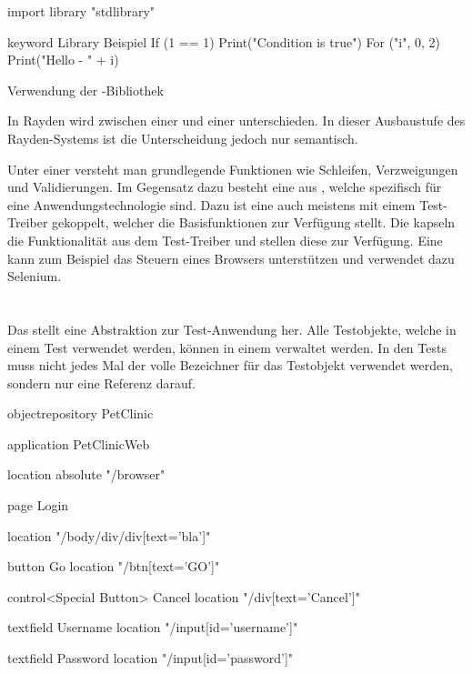 \begin{program}
\begin{JavaCode}
import library "stdlibrary"

keyword Library Beispiel {
	If (1 == 1){
		Print("Condition is true")
	}
	For ("i", 0, 2){
		Print("Hello - " + i)
	}
}
\end{JavaCode}
\caption{Verwendung der -Bibliothek}
\label{prog:libraryUsage}
\end{program}

\SuperPar
In Rayden wird zwischen einer  und einer  unterschieden. In dieser Ausbaustufe des Rayden-Systems ist die Unterscheidung jedoch nur semantisch. 

\SuperPar
Unter einer  versteht man grundlegende Funktionen wie Schleifen, Verzweigungen und Validierungen. Im Gegensatz dazu besteht eine  aus , welche spezifisch für eine Anwendungstechnologie sind. Dazu ist eine  auch meistens mit einem Test-Treiber gekoppelt, welcher die Basisfunktionen zur Verfügung stellt. Die  kapseln die Funktionalität aus dem Test-Treiber und stellen diese zur Verfügung. Eine  kann zum Beispiel das Steuern eines Browsers unterstützen und verwendet dazu Selenium. 


\section{}

Das  stellt eine Abstraktion zur Test-Anwendung her. Alle Testobjekte, welche in einem Test verwendet werden, können in einem  verwaltet werden. In den Tests muss nicht jedes Mal der volle Bezeichner für das Testobjekt verwendet werden, sondern nur eine Referenz darauf. 

\begin{program}
\begin{JavaCode}
objectrepository PetClinic {

	application PetClinicWeb {
		location absolute "/browser"
		
		page Login {
			location "/body/div/div[text='bla']"
			
			button Go {
				location "/btn[text='GO']"
			}
			
			control<Special Button> Cancel {
				location "/div[text='Cancel']"
			}
		
			textfield Username {
				location  "/input[id='username']"
			}
			
			textfield Password {
				location  "/input[id='password']"
			}			
		}
		
	}
	
}
\end{JavaCode}
\caption{}
\label{prog:or}
\end{program}

